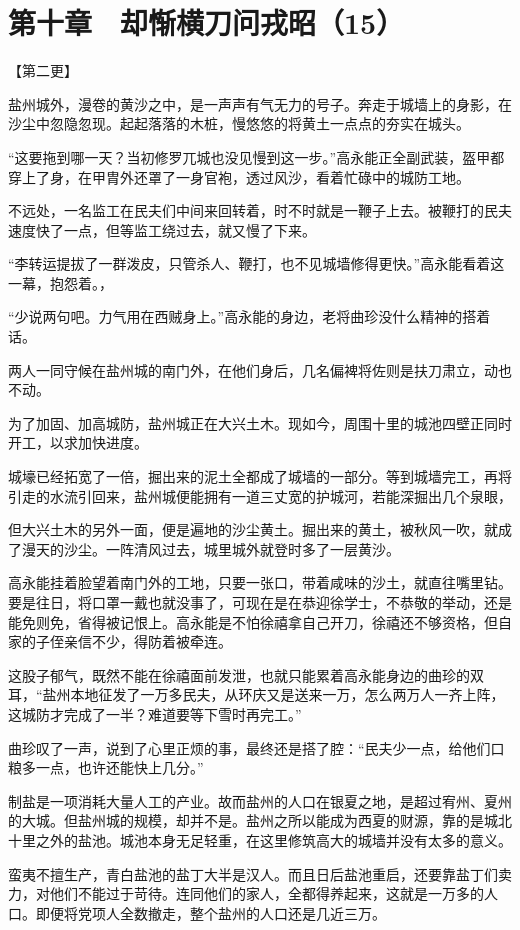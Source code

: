 \section{第十章　却惭横刀问戎昭（15）}

【第二更】

盐州城外，漫卷的黄沙之中，是一声声有气无力的号子。奔走于城墙上的身影，在沙尘中忽隐忽现。起起落落的木桩，慢悠悠的将黄土一点点的夯实在城头。

“这要拖到哪一天？当初修罗兀城也没见慢到这一步。”高永能正全副武装，盔甲都穿上了身，在甲胄外还罩了一身官袍，透过风沙，看着忙碌中的城防工地。

不远处，一名监工在民夫们中间来回转着，时不时就是一鞭子上去。被鞭打的民夫速度快了一点，但等监工绕过去，就又慢了下来。

“李转运提拔了一群泼皮，只管杀人、鞭打，也不见城墙修得更快。”高永能看着这一幕，抱怨着。，

“少说两句吧。力气用在西贼身上。”高永能的身边，老将曲珍没什么精神的搭着话。

两人一同守候在盐州城的南门外，在他们身后，几名偏裨将佐则是扶刀肃立，动也不动。

为了加固、加高城防，盐州城正在大兴土木。现如今，周围十里的城池四壁正同时开工，以求加快进度。

城壕已经拓宽了一倍，掘出来的泥土全都成了城墙的一部分。等到城墙完工，再将引走的水流引回来，盐州城便能拥有一道三丈宽的护城河，若能深掘出几个泉眼，

但大兴土木的另外一面，便是遍地的沙尘黄土。掘出来的黄土，被秋风一吹，就成了漫天的沙尘。一阵清风过去，城里城外就登时多了一层黄沙。

高永能挂着脸望着南门外的工地，只要一张口，带着咸味的沙土，就直往嘴里钻。要是往日，将口罩一戴也就没事了，可现在是在恭迎徐学士，不恭敬的举动，还是能免则免，省得被记恨上。高永能是不怕徐禧拿自己开刀，徐禧还不够资格，但自家的子侄亲信不少，得防着被牵连。

这股子郁气，既然不能在徐禧面前发泄，也就只能累着高永能身边的曲珍的双耳，“盐州本地征发了一万多民夫，从环庆又是送来一万，怎么两万人一齐上阵，这城防才完成了一半？难道要等下雪时再完工。”

曲珍叹了一声，说到了心里正烦的事，最终还是搭了腔：“民夫少一点，给他们口粮多一点，也许还能快上几分。”

制盐是一项消耗大量人工的产业。故而盐州的人口在银夏之地，是超过宥州、夏州的大城。但盐州城的规模，却并不是。盐州之所以能成为西夏的财源，靠的是城北十里之外的盐池。城池本身无足轻重，在这里修筑高大的城墙并没有太多的意义。

蛮夷不擅生产，青白盐池的盐丁大半是汉人。而且日后盐池重启，还要靠盐丁们卖力，对他们不能过于苛待。连同他们的家人，全都得养起来，这就是一万多的人口。即便将党项人全数撤走，整个盐州的人口还是几近三万。

